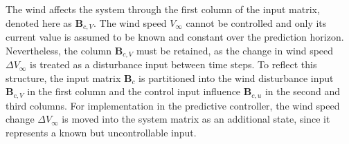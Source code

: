 %
The wind affects the system through the first column of the input matrix, denoted here as $\bm{B}_{c,V}$. The wind speed $V_{\infty}$ cannot be controlled and only its current value is assumed to be known and constant over the prediction horizon. Nevertheless, the column $\bm{B}_{c,V}$ must be retained, as the change in wind speed $\Delta V_{\infty}$ is treated as a disturbance input between time steps. To reflect this structure, the input matrix $\bm{B}_c$ is partitioned into the wind disturbance input $\bm{B}_{c,V}$ in the first column and the control input influence $\bm{B}_{c,u}$ in the second and third columns. For implementation in the predictive controller, the wind speed change $\Delta V_{\infty}$ is moved into the system matrix as an additional state, since it represents a known but uncontrollable input.

